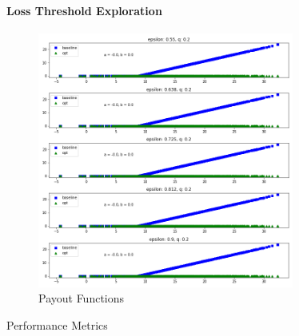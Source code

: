\documentclass[11pt]{article}
\begin{document}
        \paragraph*{Loss Threshold Exploration}
            \begin{figure}[H]
                \centering
                \caption{Payout Functions}
                \includegraphics[width=0.75\textwidth]{../../output/figures/Premium/loss_q_exploration_slope.png}
            \end{figure}

            \begin{table}[H]
                \centering
                \caption{Performance Metrics}
                
            \end{table}

            \FloatBarrier



\end{document}
